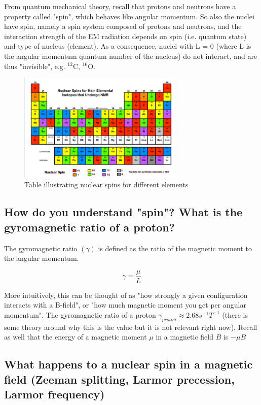 \documentclass[12pt]{article}
\begin{document}
From quantum mechanical theory, recall that protons and neutrons have a property called "spin", which behaves like angular momentum. So also the nuclei have spin, namely a spin system composed of protons and neutrons, and the interaction strength of the EM radiation depends on spin (i.e. quantum state) and type of nucleus (element). As a consequence, nuclei with L = 0 (where L is the angular momentum quantum number of the nucleus) do not interact, and are thus "invisible", e.g. $^{12}\text{C}$, $^{16}\text{O}$. %

\begin{figure}[h!]
  \centering
  \includegraphics[width=0.7\textwidth]{element_spin.png}
  \caption{Table illustrating nuclear spins for different elements \cite{mri_questions_nuclear_spin}}
  \label{fig:example}
\end{figure}


\subsection{How do you understand "spin"? What is the gyromagnetic ratio of a proton?}

The gyromagnetic ratio $(\gamma)$ is defined as the ratio of the magnetic moment to the angular momentum.

\[\gamma = \frac{\mu}{L}\]

More intuitively, this can be thought of as "how strongly a given configuration interacts with a B-field", or "how much magnetic moment you get per angular momentum". The gyromagnetic ratio of a proton $\gamma_{proton} \approx 2.68 s^{-1}T^{-1}$ (there is some theory around why this is the value but it is not relevant right now). Recall as well that the energy of a magnetic moment $\mu$ in a magnetic field $B$ is $-\mu B$

\subsection{What happens to a nuclear spin in a magnetic field (Zeeman splitting, Larmor precession, Larmor frequency)}
\end{document}
